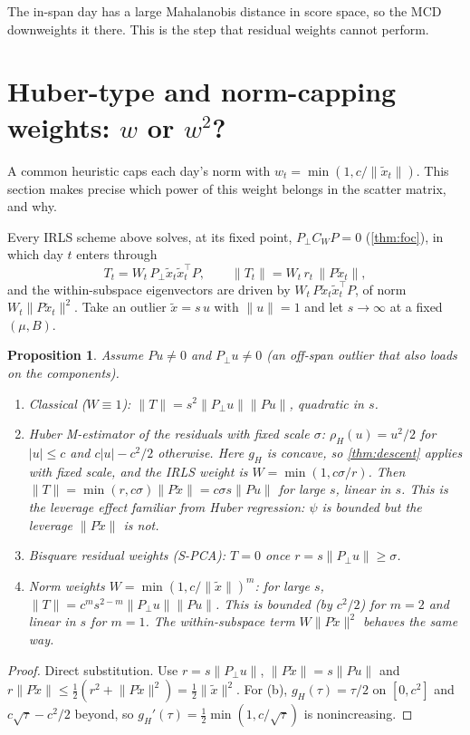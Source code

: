 \documentclass[11pt]{article}
\newtheorem{proposition}[theorem]{Proposition}
\theoremstyle{definition}
\theoremstyle{remark}
\newcommand{\norm}[1]{\lVert #1\rVert}
\newcommand{\tx}{\tilde{x}}
\newcommand{\Pp}{P_{\!\perp}}
\begin{document}
The in-span day has a large Mahalanobis distance in score space, so the MCD downweights it there. This is the step that
residual weights cannot perform.

\section{Huber-type and norm-capping weights: \texorpdfstring{$w$ or $w^2$}{w or w squared}?}\label{sec:huber}

A common heuristic caps each day's norm with $w_t=\min(1,c/\norm{\tx_t})$. This section makes precise which power of
this weight belongs in the scatter matrix, and why.

Every IRLS scheme above solves, at its fixed point, $\Pp C_WP=0$ (\cref{thm:foc}), in which day $t$ enters through
\[
T_t=W_t\,\Pp\tx_t\tx_t^\top P,\qquad \norm{T_t}=W_t\,r_t\,\norm{P\tx_t},
\]
and the within-subspace eigenvectors are driven by $W_t\,P\tx_t\tx_t^\top P$, of norm $W_t\norm{P\tx_t}^2$.
Take an outlier $\tx=s\,u$ with $\norm u=1$ and let $s\to\infty$ at a fixed $(\mu,B)$.

\begin{proposition}\label{prop:huber}
Assume $Pu\ne0$ and $\Pp u\ne0$ (an off-span outlier that also loads on the components).
\begin{enumerate}[label=(\alph*)]
\item Classical ($W\equiv1$): $\norm{T}=s^2\norm{\Pp u}\norm{Pu}$, quadratic in $s$.
\item Huber M-estimator of the residuals with fixed scale $\sigma$: $\rho_H(u)=u^2/2$ for $|u|\le c$ and $c|u|-c^2/2$
otherwise. Here $g_H$ is concave, so \cref{thm:descent} applies with fixed scale, and the IRLS weight is
$W=\min(1,c\sigma/r)$. Then $\norm{T}=\min(r,c\sigma)\norm{P\tx}=c\sigma s\norm{Pu}$ for large $s$, linear in $s$.
This is the leverage effect familiar from Huber regression: $\psi$ is bounded but the leverage $\norm{P\tx}$ is not.
\item Bisquare residual weights (S-PCA): $T=0$ once $r=s\norm{\Pp u}\ge\sigma$.
\item Norm weights $W=\min(1,c/\norm{\tx})^{m}$: for large $s$, $\norm{T}=c^m s^{2-m}\norm{\Pp u}\norm{Pu}$. This is
bounded (by $c^2/2$) for $m=2$ and linear in $s$ for $m=1$. The within-subspace term $W\norm{P\tx}^2$ behaves the same way.
\end{enumerate}
\end{proposition}
\begin{proof}
Direct substitution. Use $r=s\norm{\Pp u}$, $\norm{P\tx}=s\norm{Pu}$ and
$r\norm{P\tx}\le\tfrac12(r^2+\norm{P\tx}^2)=\tfrac12\norm{\tx}^2$. For (b), $g_H(\tau)=\tau/2$ on $[0,c^2]$ and
$c\sqrt\tau-c^2/2$ beyond, so $g_H'(\tau)=\frac12\min(1,c/\sqrt\tau)$ is nonincreasing.
\end{proof}
\end{document}

